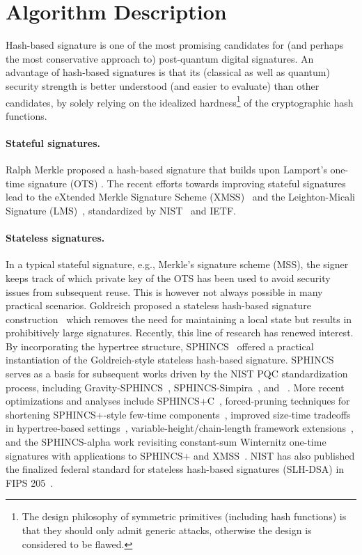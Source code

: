 \section{Algorithm Description} \label{sec:intro}

Hash-based signature is one of the most promising candidates for (and perhaps the most conservative approach to)  post-quantum digital signatures. An advantage of hash-based signatures is that its (classical as well as quantum) security strength is better understood (and easier to evaluate) than other candidates, by solely relying on the idealized hardness\footnote{The design philosophy of symmetric primitives (including hash functions) is that they should only admit generic attacks, otherwise the design is considered to be flawed.} of the cryptographic hash functions.  

\paragraph{Stateful signatures.} Ralph Merkle proposed a hash-based signature \cite{C:Merkle89a} that builds upon Lamport's one-time signature (OTS) \cite{Lamport79}. The recent efforts towards improving stateful signatures lead to the eXtended Merkle Signature Scheme (XMSS)~\cite{hulsing2018xmss} and the Leighton-Micali Signature (LMS)~\cite{mcgrew2019leighton},  standardized by NIST~\cite{cooper2020recommendation} and IETF.

\paragraph{Stateless signatures.} In a typical stateful signature, e.g., Merkle's signature scheme (MSS), the signer keeps track of which private key of the OTS has been used to avoid security issues from subsequent reuse. This is however not always possible in many practical scenarios. Goldreich proposed a stateless hash-based signature construction~\cite{C:Goldreich86a,Goldreich04} which removes the need for maintaining a local state but results in prohibitively large signatures. Recently, this line of research has renewed interest. By incorporating the hypertree structure, SPHINCS~\cite{EC:BHHLNP15} offered a practical instantiation of the Goldreich-style stateless hash-based signature. SPHINCS serves as a basis for subsequent works driven by the NIST PQC standardization process, including Gravity-SPHINCS~\cite{RSA:AumEnd18}, SPHINCS-Simpira~\cite{EPRINT:GueMou17}, and \SPHINCSP\ \cite{CCS:BHKNRS19}. More recent optimizations and analyses include SPHINCS+C~\cite{SP:HKRY23}, forced-pruning techniques for shortening SPHINCS+-style few-time components~\cite{EPRINT:AbrKat25}, improved size-time tradeoffs in hypertree-based settings~\cite{C:KhoKudWag25}, variable-height/chain-length framework extensions~\cite{EPRINT:QinSun25}, and the SPHINCS-alpha work revisiting constant-sum Winternitz one-time signatures with applications to SPHINCS+ and XMSS~\cite{optimalwots}. NIST has also published the finalized federal standard for stateless hash-based signatures (SLH-DSA) in FIPS 205~\cite{NIST:FIPS205}.


